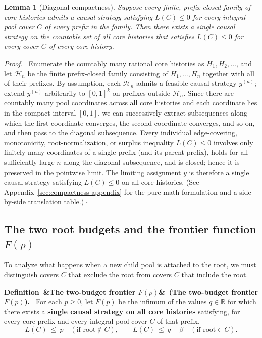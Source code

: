 \documentclass[11pt,letterpaper]{article}
\newtheorem{lemma}{Lemma}[section]
\newenvironment{definition}[1][]{\refstepcounter{lemma}\par\medskip\noindent\textbf{Definition~\thelemma\ifx&#1&\else\ (#1)\fi.}\ \ignorespaces}{\par\medskip}
\newenvironment{proof}[1][Proof]{\par\smallskip\noindent\textit{#1.}\ \ignorespaces}{\hfill$\square$\par\medskip}
\begin{document}
\begin{lemma}[Diagonal compactness]\label{lem:compactness}
Suppose every finite, prefix-closed family of core histories admits a causal strategy satisfying $L(C)\le 0$ for every integral pool cover $C$ of every prefix in the family. Then there exists a single causal strategy on the countable set of \emph{all} core histories that satisfies $L(C)\le 0$ for every cover $C$ of every core history.
\end{lemma}

\begin{proof}
Enumerate the countably many rational core histories as $H_1,H_2,\ldots$, and let $\mathcal H_n$ be the finite prefix-closed family consisting of $H_1,\ldots,H_n$ together with all of their prefixes. By assumption, each $\mathcal H_n$ admits a feasible causal strategy $y^{(n)}$; extend $y^{(n)}$ arbitrarily to $[0,1]^k$ on prefixes outside $\mathcal H_n$. Since there are countably many pool coordinates across all core histories and each coordinate lies in the compact interval $[0,1]$, we can successively extract subsequences along which the first coordinate converges, the second coordinate converges, and so on, and then pass to the diagonal subsequence. Every individual edge-covering, monotonicity, root-normalization, or surplus inequality $L(C)\le 0$ involves only finitely many coordinates of a single prefix (and its parent prefix), holds for all sufficiently large $n$ along the diagonal subsequence, and is closed; hence it is preserved in the pointwise limit. The limiting assignment $y$ is therefore a single causal strategy satisfying $L(C)\le 0$ on all core histories. (See Appendix~\ref{sec:compactness-appendix} for the pure-math formulation and a side-by-side translation table.)
\end{proof}

\subsection{The two root budgets and the frontier function \texorpdfstring{$F(p)$}{F(p)}}

To analyze what happens when a new child pool is attached to the root, we must distinguish covers $C$ that exclude the root from covers $C$ that include the root.

\begin{definition}[The two-budget frontier $F(p)$]\label{def:frontier}
For each $p\ge 0$, let $F(p)$ be the infimum of the values $q\in\mathbb R$ for which there exists a \textbf{single causal strategy on all core histories} satisfying, for every core prefix and every integral pool cover $C$ of that prefix,
\begin{equation}\label{eq:promises}
  L(C)\ \le\ p \quad(\text{if }\text{root}\notin C),\qquad
  L(C)\ \le\ q-\beta \quad(\text{if }\text{root}\in C).
\end{equation}
\end{definition}
\end{document}

